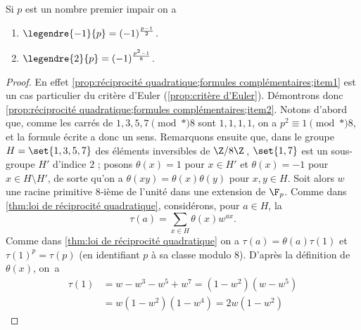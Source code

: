 \documentclass[11pt, %
  title in boldface,
  theorem in new line,
  theorem numbering = section,
  number theorems separately,
  simple name,
]{beaulivre}
\begin{document}
    \begin{proposition}\label{prop:réciprocité quadratique;formules complémentaires}
        Si \( p \) est un nombre premier impair on a
        \begin{enumerate}
            \item \label{prop:réciprocité quadratique;formules complémentaires;item1} \( \legendre{-1}{p} = (-1)^{\frac{p-1}{2}} \).
            \item \label{prop:réciprocité quadratique;formules complémentaires;item2} \( \legendre{2}{p} = (-1)^{\frac{p^2-1}{8}} \).
        \end{enumerate}
    \end{proposition}
    \begin{proof}
        En effet \ref{prop:réciprocité quadratique;formules complémentaires;item1} est un cas particulier du critère d'Euler (\cref{prop:critère d'Euler}). Démontrons donc \ref{prop:réciprocité quadratique;formules complémentaires;item2}. Notons d'abord que, comme les carrés de \( 1,3,5,7 \pmod*{8} \) sont \( 1,1,1,1 \), on a \( p^2 \equiv 1 \pmod*{8} \), et la formule écrite a donc un sens. Remarquons ensuite que, dans le groupe \( H = \set{1,3,5,7} \) des éléments inversibles de \( \Z/8\Z \)\,, \( \set{1,7} \) est un sous-groupe \( H' \) d'indice \( 2 \) ; posons \( \theta(x) = 1 \) pour \( x \in H' \) et \( \theta(x) = -1 \) pour \( x \in H \setminus H' \), de sorte qu'on a \( \theta(xy) = \theta(x)\theta(y) \) pour \( x,y \in H \). Soit alors \( w \) une racine primitive \( 8 \)‑ième de l'unité dans une extension de \( \F_p \). Comme dans \cref{thm:loi de réciprocité quadratique}, considérons, pour \( a \in H \), la 
        \begin{equation}
            \tau(a) = \sum_{x \in H} \theta(x) w^{ax}.
        \end{equation}
        Comme dans \cref{thm:loi de réciprocité quadratique} on a \( \tau(a) = \theta(a) \tau(1) \) et \( \tau(1)^p = \tau(p) \) (en identifiant \( p \) à sa classe modulo \( 8 \)). D'après la définition de \( \theta(x) \), on~a
        \vspace{-.2\baselineskip}%
        {\allowdisplaybreaks%
        \begin{align*}
            \tau(1) &= w - w^3 - w^5 + w^7 = (1-w^2)(w-w^5)\\
            &= w(1-w^2)(1-w^4) = 2w(1-w^2)
        \end{align*}}%
        \vspace{-1.2\baselineskip}\par\noindent%

\end{proof}
\end{document}
